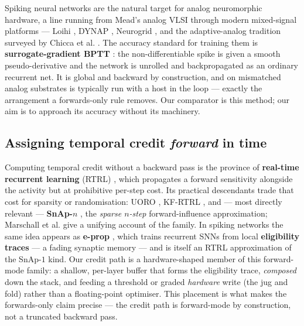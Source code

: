 \documentclass[11pt]{article}
\begin{document}
Spiking neural networks are the natural target for analog neuromorphic
hardware, a line running from Mead's analog VLSI \cite{mead1989analog}
through modern mixed-signal platforms --- Loihi \cite{davies2018loihi},
DYNAP \cite{moradi2018dynap}, Neurogrid \cite{benjamin2014neurogrid},
and the adaptive-analog tradition surveyed by Chicca et al.
\cite{chicca2014neuromorphic, rubino2023neuromorphic}. The accuracy
standard for training them is \textbf{surrogate-gradient BPTT}
\cite{neftci2019surrogate, cramer2022surrogate}: the non-differentiable
spike is given a smooth pseudo-derivative and the network is unrolled
and backpropagated as an ordinary recurrent net. It is global and
backward by construction, and on mismatched analog substrates is
typically run with a host in the loop --- exactly the arrangement a
forwards-only rule removes. Our comparator is this method; our aim is to
approach its accuracy without its machinery.

\hypertarget{assigning-temporal-credit-forward-in-time}{%
\subsection{\texorpdfstring{Assigning temporal credit \emph{forward} in
time}{Assigning temporal credit forward in time}}\label{assigning-temporal-credit-forward-in-time}}

Computing temporal credit without a backward pass is the province of
\textbf{real-time recurrent learning} (RTRL)
\cite{williams1989learning}, which propagates a forward sensitivity
alongside the activity but at prohibitive per-step cost. Its practical
descendants trade that cost for sparsity or randomisation: UORO
\cite{tallec2018unbiased}, KF-RTRL \cite{mujika2018approximating}, and
--- most directly relevant --- \textbf{SnAp-\(n\)}
\cite{menick2021snap}, the \emph{sparse \(n\)-step} forward-influence
approximation; Marschall et al. \cite{marschall2020unified} give a
unifying account of the family. In spiking networks the same idea
appears as \textbf{e-prop} \cite{bellec2020eprop}, which trains
recurrent SNNs from local \textbf{eligibility traces} --- a fading
synaptic memory --- and is itself an RTRL approximation of the
SnAp-\(1\) kind. Our credit path is a hardware-shaped member of this
forward-mode family: a shallow, per-layer buffer that forms the
eligibility trace, \emph{composed} down the stack, and feeding a
threshold or graded \emph{hardware} write (the jug and fold) rather than
a floating-point optimiser. This placement is what makes the
forwards-only claim precise --- the credit path is forward-mode by
construction, not a truncated backward pass.
\end{document}
